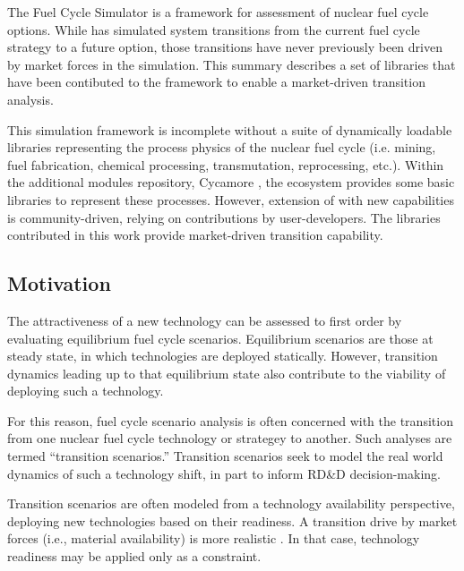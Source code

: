 
The \Cyclus Fuel Cycle Simulator \cite{carlsen_cyclus_2014} is a framework for 
assessment of nuclear fuel cycle options. While \Cyclus has simulated system 
transitions from the current fuel cycle strategy to a future option, those 
transitions have never previously been driven by market forces in the 
simulation.  This summary describes a set of libraries that have been 
contibuted to the \Cyclus framework to enable a market-driven transition 
analysis.

This simulation framework is incomplete without a suite of dynamically loadable 
libraries representing the process physics of the nuclear fuel cycle (i.e.  
mining, fuel fabrication, chemical processing, transmutation, reprocessing, 
etc.).  Within the additional modules repository, Cycamore 
\cite{carlsen_cycamore_2014}, the \Cyclus ecosystem provides some basic 
libraries to represent these processes. However, extension of \Cyclus with new 
capabilities is community-driven, relying on contributions by user-developers. 
The libraries contributed in this work provide market-driven transition capability.

\subsection{Motivation}

The attractiveness of a new technology can be assessed to first order by 
evaluating equilibrium fuel cycle scenarios. Equilibrium scenarios are those 
at steady state, in which technologies are deployed statically. However, 
transition dynamics leading up to that equilibrium state also contribute to 
the viability of deploying such a technology.  

For this reason, fuel cycle scenario analysis is often concerned with the 
transition from one nuclear fuel cycle technology or strategey to another. Such 
analyses are termed ``transition scenarios.''  Transition scenarios seek to 
model the real world dynamics of such a technology shift, in part to inform 
RD\&D decision-making. 

Transition scenarios are often modeled from a technology availability 
perspective, deploying new technologies based on their readiness.  A transition 
drive by market forces (i.e., material availability) is more realistic . In 
that case, technology readiness may be applied only as a constraint. 

